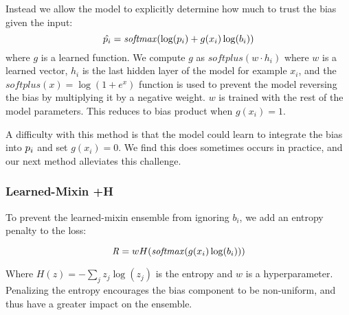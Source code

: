 \documentclass[11pt,a4paper]{article}
\begin{document}
Instead we allow the model to explicitly determine how much to trust the bias given the input: $$\hat{p_i} = \mathit{softmax}(\log(p_i) + g(x_i)\log(b_i))$$ 
where $g$ is a learned function. We compute $g$ as $\mathit{softplus}(w\cdot h_i)$ where $w$ is a learned vector, $h_i$ is the last hidden layer of the model for example $x_i$, and the $\mathit{softplus}(x) = \log(1 + e^x)$ function is used to prevent the model reversing the bias by multiplying it by a negative weight. $w$ is trained with the rest of the model parameters. This reduces to bias product when $g(x_i) = 1$.

A difficulty with this method is that the model could learn to integrate the bias into $p_i$ and set $g(x_i) = 0$.
We find this does sometimes occurs in practice, and our next method alleviates this challenge.


\subsubsection{Learned-Mixin +H}
To prevent the learned-mixin ensemble from ignoring $b_i$, we add an entropy penalty to the loss:

$$\mathit{R} = wH(\mathit{softmax}(g(x_i)\log(b_i)))$$ 

Where $H(z) = -\sum_{j}z_{j}\log(z_{j})$ is the entropy and $w$ is a hyperparameter. Penalizing the entropy encourages the bias component to be non-uniform, and thus have a greater impact on the ensemble. 
 
\end{document}
